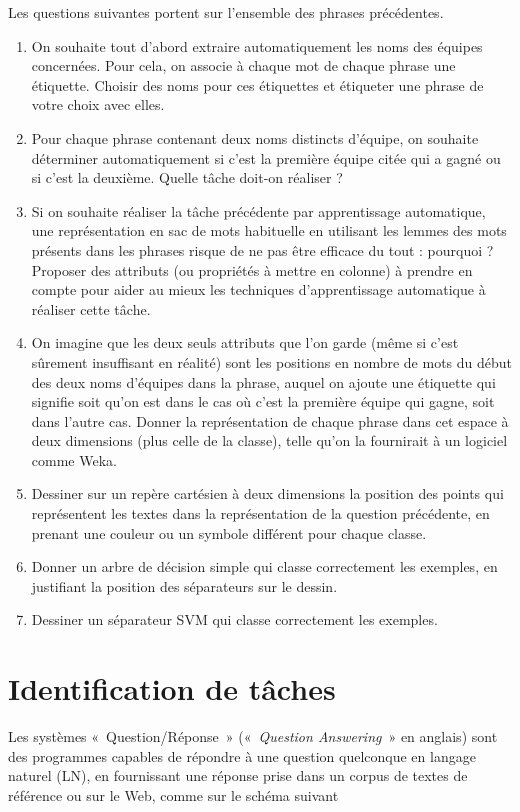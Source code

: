 \documentclass[a4paper, 11pt]{article}
\begin{document}
Les questions suivantes portent sur l'ensemble des phrases précédentes.
\begin{enumerate}
    \item On souhaite tout d'abord extraire automatiquement les noms des équipes concernées.
        Pour cela, on associe à chaque mot de chaque phrase une étiquette.
        Choisir des noms pour ces étiquettes et étiqueter une phrase de votre choix avec elles.
    \item Pour chaque phrase contenant deux noms distincts d'équipe, on souhaite déterminer
        automatiquement si c'est la première équipe citée qui a gagné ou si c'est la deuxième.
        Quelle tâche doit-on réaliser ?
    \item Si on souhaite réaliser la tâche précédente par apprentissage automatique, une
        représentation en sac de mots habituelle en utilisant les lemmes des mots présents dans les
        phrases risque de ne pas être efficace du tout : pourquoi ?
        Proposer des attributs (ou propriétés à mettre en colonne) à prendre en compte pour aider au
        mieux les techniques d'apprentissage automatique à réaliser cette tâche.
    \item On imagine que les deux seuls attributs que l'on garde (même si c'est sûrement
        insuffisant en réalité) sont les positions en nombre de mots du début des deux noms
        d'équipes dans la phrase, auquel on ajoute une étiquette qui signifie soit qu'on est dans
        le cas où c'est la première équipe qui gagne, soit dans l'autre cas.
        Donner la représentation de chaque phrase dans cet espace à deux dimensions (plus celle de
        la classe), telle qu'on la fournirait à un logiciel comme Weka.
    \item Dessiner sur un repère cartésien à deux dimensions la position des points qui
        représentent les textes dans la représentation de la question précédente, en prenant une
        couleur ou un symbole différent pour chaque classe.
    \item Donner un arbre de décision simple qui classe correctement les exemples, en justifiant
        la position des séparateurs sur le dessin.
    \item Dessiner un séparateur SVM qui classe correctement les exemples.
\end{enumerate}

\section{Identification de tâches}
Les systèmes « Question/Réponse » (« \emph{Question Answering} » en anglais) sont des programmes
capables de répondre à une question quelconque en langage naturel (LN), en fournissant une réponse
prise dans un corpus de textes de référence ou sur le Web, comme sur le schéma suivant
\end{document}
